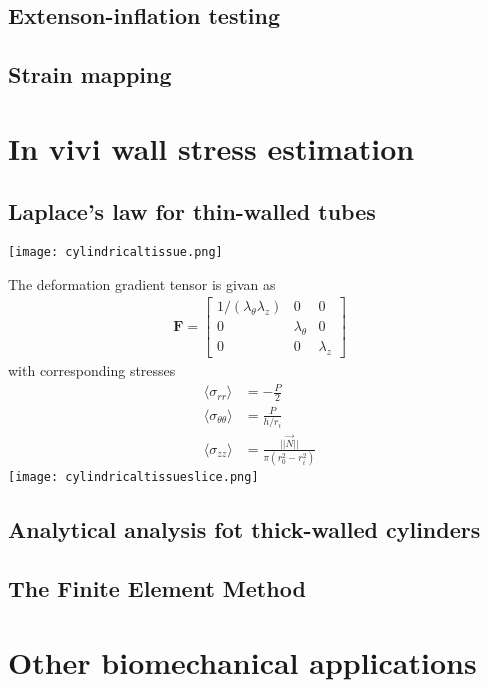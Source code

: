 \documentclass[../main.tex]{subfiles}
\begin{document}
\subsection{Extenson-inflation testing}
\subsection{Strain mapping}

\section{In vivi wall stress estimation}

\subsection{Laplace's law for thin-walled tubes}

\texttt{[image: cylindricaltissue.png]}

The deformation gradient tensor is givan as
\begin{align}
    \textbf{F} = \left[\begin{matrix}
        1/(\lambda_{\theta}\lambda_z) & 0 & 0 \\
        0 & \lambda_{\theta} & 0 \\
        0 & 0 & \lambda_z
    \end{matrix}\right]
\end{align}
with corresponding stresses
\begin{align}
    \langle \sigma_{rr} \rangle &= -\frac{P}{2} \\
    \langle \sigma_{\theta\theta} \rangle &= \frac{P}{h/r_i}\\
    \langle \sigma_{zz} \rangle &= \frac{||\vec{N}||}{\pi(r^2_0-r^2_i)}
\end{align}
\texttt{[image: cylindricaltissueslice.png]}

\subsection{Analytical analysis fot thick-walled cylinders}

\subsection{The Finite Element Method}

\section{Other biomechanical applications}
\end{document}

